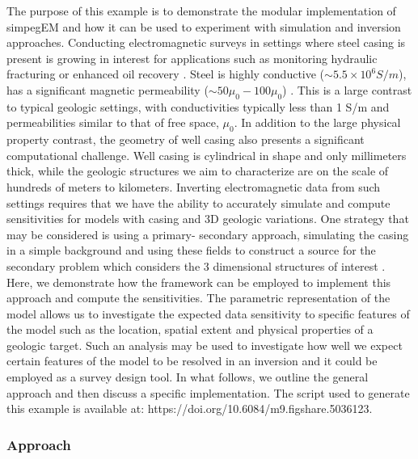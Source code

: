 \documentclass[preprint,review,3p,times,onecolumn,authoryear]{elsarticle}
\begin{document}
The purpose of this example is to demonstrate the modular implementation of
simpegEM and how it can be used to experiment with simulation and inversion
approaches.  Conducting electromagnetic surveys in settings where steel casing
is present is growing in interest for applications such as monitoring
hydraulic fracturing or enhanced oil recovery \citep{Hoversten2015, Um2015,
Commer2015, Hoversten2014, Marsala2015, cuevas2014eage, Weiss2015,Yang2016a}. Steel is highly
conductive ($\sim 5.5\times10^6 S/m$), has a significant magnetic permeability
($\sim 50\mu_0 - 100 \mu_0$) \citep{wuhabashy1994}. This is a large
contrast to typical geologic settings, with conductivities typically less than
1 S/m and permeabilities similar to that of free space, $\mu_0$. In addition
to the large physical property contrast, the geometry of well casing also
presents a significant computational challenge. Well casing is cylindrical in
shape and only millimeters thick, while the geologic structures we aim to
characterize are on the scale of hundreds of meters to kilometers. Inverting
electromagnetic data from such settings requires that we have the ability to
accurately simulate and compute sensitivities for models with casing and 3D
geologic variations.  One strategy that may be considered is using a primary-
secondary approach, simulating the casing in a simple background and using
these fields to construct a source for the secondary problem which considers
the 3 dimensional structures of interest \citep{Heagy2015}. Here, we
demonstrate how the framework can be employed to implement this approach and
compute the sensitivities. The parametric representation of the model allows
us to investigate the expected data sensitivity to specific features of the model
such as the location, spatial extent and physical properties of a geologic
target. Such an analysis may be used to investigate how well we expect certain
features of the model to be resolved in an inversion and it could be employed as
a survey design tool. In what follows, we outline the general approach and
then discuss a specific implementation. The script used to generate this example is
available at: https://doi.org/10.6084/m9.figshare.5036123.



\subsubsection{Approach}
\label{sec:casingApproach}
\end{document}
